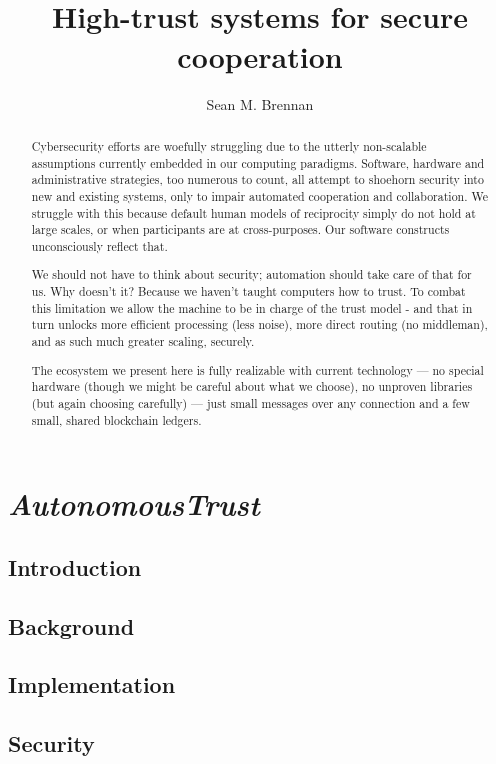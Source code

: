 \documentclass[10pt,twoside]{article}
\title{\textbf{\huge \projectName}\\ High-trust systems for secure cooperation}
\author{Sean M. Brennan}
\date{\monthname{} \the\year}
\newcommand{\projectName}{\emph{AutonomousTrust }}
\begin{document}
\ifpdf
\TekFiveTitle
\else
\chapter{\projectName}
\fi

\begin{abstract}
	Cybersecurity efforts are woefully struggling due to the utterly non-scalable assumptions currently embedded in our computing paradigms.
	Software, hardware and administrative strategies, too numerous to count, all attempt to shoehorn security into new and existing systems, only to impair automated cooperation and collaboration.
	We struggle with this because default human models of reciprocity simply do not hold at large scales, or when participants are at cross-purposes.
	Our software constructs unconsciously reflect that.
	
	We should not have to think about security; automation should take care of that for us.
	Why doesn't it?
	Because we haven't taught computers how to trust.
	To combat this limitation we allow the machine to be in charge of the trust model - and that in turn unlocks more efficient processing (less noise), more direct routing (no middleman), and as such much greater scaling, securely.
		
	The ecosystem we present here is fully realizable with current technology --- no special hardware (though we might be careful about what we choose), no unproven libraries (but again choosing carefully) --- just small messages over any connection and a few small, shared blockchain ledgers.
\end{abstract}

\section{Introduction}\label{sec:intro}


\section{Background}\label{sec:background}


\section{Implementation}\label{sec:implementation}


\section{Security}\label{sec:vectors}

\end{document}
